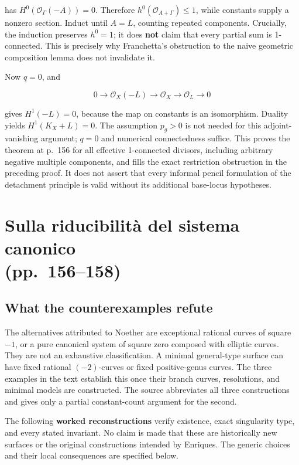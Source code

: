 has \(H^0(\mathcal O_\Gamma(-A))=0\). Therefore \(h^0(\mathcal O_{A+\Gamma})\le1\), while constants supply a nonzero section. Induct until \(A=L\), counting repeated components. Crucially, the induction preserves \(h^0=1\); it does \textbf{not} claim that every partial sum is 1-connected. This is precisely why Franchetta's obstruction to the naive geometric composition lemma does not invalidate it.

Now \(q=0\), and

\[
0\to\mathcal O_X(-L)\to\mathcal O_X\to\mathcal O_L\to0
\]

gives \(H^1(-L)=0\), because the map on constants is an isomorphism. Duality yields \(H^1(K_X+L)=0\). The assumption \(p_g>0\) is not needed for this adjoint-vanishing argument; \(q=0\) and numerical connectedness suffice. This proves the theorem at p.~156 for all effective 1-connected divisors, including arbitrary negative multiple components, and fills the exact restriction obstruction in the preceding proof. It does not assert that every informal pencil formulation of the detachment principle is valid without its additional base-locus hypotheses.

\section[Riducibilità del sistema canonico]{Sulla riducibilità del sistema canonico\\(pp.~156--158)}\label{enriques-iv-18}

\subsection{What the counterexamples refute}

The alternatives attributed to Noether are exceptional rational curves of square \(-1\), or a pure canonical system of square zero composed with elliptic curves. They are not an exhaustive classification. A minimal general-type surface can have fixed rational \((-2)\)-curves or fixed positive-genus curves. The three examples in the text establish this once their branch curves, resolutions, and minimal models are constructed. The source abbreviates all three constructions and gives only a partial constant-count argument for the second.

The following \textbf{worked reconstructions} verify existence, exact singularity type, and every stated invariant. No claim is made that these are historically new surfaces or the original constructions intended by Enriques. The generic choices and their local consequences are specified below.

